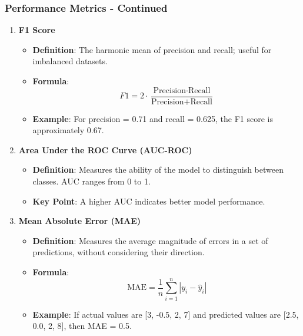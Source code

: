 \documentclass[aspectratio=169]{beamer}
\begin{document}
\begin{frame}[fragile]
    \frametitle{Performance Metrics - Continued}
    \begin{enumerate}[resume]
        \item \textbf{F1 Score}
        \begin{itemize}
            \item \textbf{Definition}: The harmonic mean of precision and recall; useful for imbalanced datasets.
            \item \textbf{Formula}:
            \begin{equation}
            F1 = 2 \cdot \frac{\text{Precision} \cdot \text{Recall}}{\text{Precision} + \text{Recall}}
            \end{equation}
            \item \textbf{Example}: For precision = 0.71 and recall = 0.625, the F1 score is approximately 0.67.
        \end{itemize}

        \item \textbf{Area Under the ROC Curve (AUC-ROC)}
        \begin{itemize}
            \item \textbf{Definition}: Measures the ability of the model to distinguish between classes. AUC ranges from 0 to 1.
            \item \textbf{Key Point}: A higher AUC indicates better model performance.
        \end{itemize}

        \item \textbf{Mean Absolute Error (MAE)}
        \begin{itemize}
            \item \textbf{Definition}: Measures the average magnitude of errors in a set of predictions, without considering their direction.
            \item \textbf{Formula}:
            \begin{equation}
            \text{MAE} = \frac{1}{n} \sum_{i=1}^n |y_i - \hat{y}_i|
            \end{equation}
            \item \textbf{Example}: If actual values are [3, -0.5, 2, 7] and predicted values are [2.5, 0.0, 2, 8], then MAE = 0.5.
        \end{itemize}
    \end{enumerate}
\end{frame}
\end{document}
